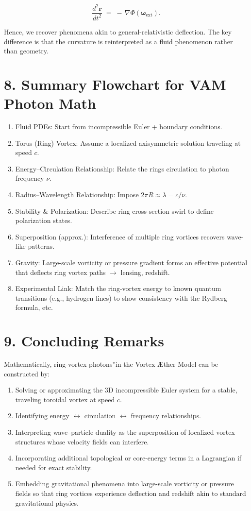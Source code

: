 \[
 \frac{d^2 \mathbf{r}}{dt^2} \;=\; -\,\nabla \Phi(\boldsymbol{\omega}_{\mathrm{ext}}).
\]

Hence, we recover phenomena akin to general-relativistic deflection. The key difference is that the curvature is reinterpreted as a fluid phenomenon rather than geometry.

\section*{8. Summary Flowchart for VAM Photon Math}
\begin{enumerate}
 \item Fluid PDEs: Start from incompressible Euler + boundary conditions.
 \item Torus (Ring) Vortex: Assume a localized axisymmetric solution traveling at speed \(c\).
 \item Energy–Circulation Relationship: Relate the ring\rqs s circulation to photon frequency \(\nu\).
 \item Radius–Wavelength Relationship: Impose \(2\pi R \approx \lambda = c/\nu\).
 \item Stability \& Polarization: Describe ring cross-section swirl to define polarization states.
 \item Superposition (approx.): Interference of multiple ring vortices recovers wave-like patterns.
 \item Gravity: Large-scale vorticity or pressure gradient forms an effective potential that deflects ring vortex paths \(\rightarrow\) lensing, redshift.
 \item Experimental Link: Match the ring-vortex energy to known quantum transitions (e.g., hydrogen lines) to show consistency with the Rydberg formula, etc.
\end{enumerate}

\section*{9. Concluding Remarks}
Mathematically, ring-vortex \grqq photons\textquotedblright in the Vortex Æther Model can be constructed by:

\begin{enumerate}
 \item Solving or approximating the 3D incompressible Euler system for a stable, traveling toroidal vortex at speed \(c\).
 \item Identifying energy \(\leftrightarrow\) circulation \(\leftrightarrow\) frequency relationships.
 \item Interpreting wave–particle duality as the superposition of localized vortex structures whose velocity fields can interfere.
 \item Incorporating additional topological or core-energy terms in a Lagrangian if needed for exact stability.
 \item Embedding gravitational phenomena into large-scale vorticity or pressure fields so that ring vortices experience deflection and redshift akin to standard gravitational physics.
\end{enumerate}

